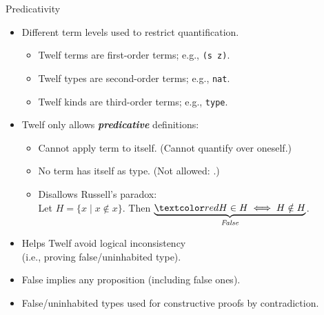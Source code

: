 \documentclass{beamer}
\renewcommand{\emph}[1]{\textbf{\textit{#1}}}
\begin{document}
\begin{frame}{Predicativity}
\begin{itemize}
\item Different term levels used to restrict quantification.
  \begin{itemize}
  \item Twelf terms are first-order terms; e.g., \texttt{(s z)}.
  \item Twelf types are second-order terms; e.g., \texttt{nat}.
  \item Twelf kinds are third-order terms; e.g., \texttt{type}.
  \end{itemize}

\pause
\item Twelf only allows \emph{predicative} definitions:
  \begin{itemize}
  \item Cannot apply term to itself. (Cannot quantify over oneself.)
  \item No term has itself as type. (Not allowed: \texttt{}.)
  \item Disallows Russell's paradox: \\
  Let $H = \{ x \; | \; x \notin x\}$.
  Then $\underbrace{\cemph{H \in H \iff H \notin H}}_{\textit{False}}$.
  \end{itemize}

\item Helps Twelf avoid logical inconsistency \\
(i.e., proving false/uninhabited type).

\item False implies any proposition (including false ones).

\item False/uninhabited types used for constructive
proofs by contradiction.
\end{itemize}
\end{frame}


\end{document}

